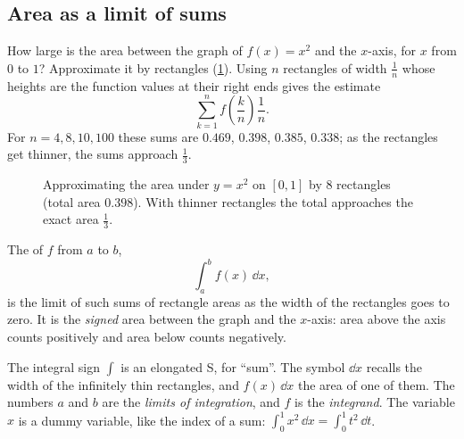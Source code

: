 \subsection{Area as a limit of sums}

How large is the area between the graph of $f(x) = x^2$ and the $x$-axis, for
$x$ from $0$ to $1$? Approximate it by rectangles (\cref{fig:riemann}). Using
$n$ rectangles of width $\frac1n$ whose heights are the function values at their
right ends gives the estimate
\[
  \sum_{k=1}^{n} f\!\left(\frac kn\right)\frac1n .
\]
For $n = 4, 8, 10, 100$ these sums are $0.469$, $0.398$, $0.385$, $0.338$; as
the rectangles get thinner, the sums approach $\frac13$.

\begin{figure}[htbp]
\centering
{}
\caption{Approximating the area under $y = x^2$ on $[0,1]$ by $8$ rectangles
  (total area $0.398$). With thinner rectangles the total approaches the exact
  area $\frac13$.}
\label{fig:riemann}
\end{figure}

\begin{definition}\label{def:integral}
The  of $f$ from $a$ to $b$,
\[
  \int_a^b f(x)\,\dd x ,
\]
is the limit of such sums of rectangle areas as the width of the rectangles
goes to zero. It is the \emph{signed} area between the graph and the $x$-axis:
area above the axis counts positively and area below counts negatively.
\end{definition}

\begin{notation}
The integral sign $\int$ is an elongated S, for ``sum''. The symbol $\dd x$
recalls the width of the infinitely thin rectangles, and $f(x)\,\dd x$ the area
of one of them. The numbers $a$ and $b$ are the \emph{limits of integration},
and $f$ is the \emph{integrand}. The variable $x$ is a dummy variable, like
the index of a sum: $\int_0^1 x^2\,\dd x = \int_0^1 t^2\,\dd t$.
\end{notation}

